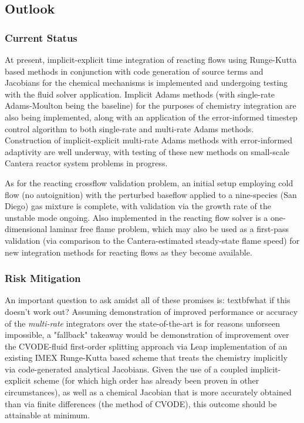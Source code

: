 \subsection{Outlook}

\subsubsection{Current Status}

At present, implicit-explicit time integration of reacting flows using Runge-Kutta
based methods in conjunction with code generation of source terms and Jacobians for
the chemical mechanisms is implemented and undergoing testing with the fluid solver
application. Implicit Adams methods (with single-rate Adams-Moulton being the baseline)
for the purposes of chemistry integration are also being implemented, along with
an application of the error-informed timestep control algorithm to both
single-rate and multi-rate Adams methods. Construction of implicit-explicit multi-rate
Adams methods with error-informed adaptivity are well underway, with testing
of these new methods on small-scale Cantera reactor system problems in progress.

As for the reacting crossflow validation problem, an initial setup employing
cold flow (no autoignition) with the perturbed baseflow applied to a nine-species
(San Diego) gas mixture is complete, with validation via the growth rate of the
unstable mode ongoing. Also implemented in the reacting flow solver is a one-dimensional
laminar free flame problem, which may also be used as a first-pass validation (via
comparison to the Cantera-estimated steady-state flame speed) for new integration
methods for reacting flows as they become available.

\subsubsection{Risk Mitigation}

An important question to ask amidst all of these promises is: 
textbf{what if this doesn't work out?} Assuming demonstration of improved
performance or accuracy of the \emph{multi-rate} integrators over the
state-of-the-art is for reasons unforseen impossible, a "fallback" takeaway
would be demonstration of improvement over the CVODE-fluid first-order splitting
approach via Leap implementation of an existing IMEX Runge-Kutta based scheme
that treats the chemistry implicitly via code-generated analytical Jacobians.
Given the use of a coupled implicit-explicit scheme (for which high order has
already been proven in other circumstances), as well as a chemical Jacobian
that is more accurately obtained than via finite differences (the method
of CVODE), this outcome should be attainable at minimum.


